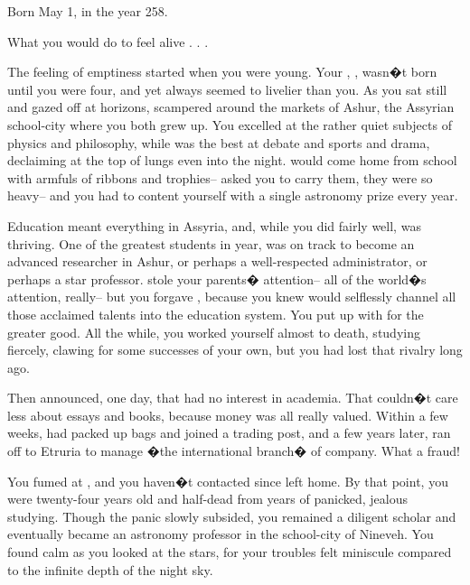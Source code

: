 \documentclass[char]{Kos}
\begin{document}
\name{\cAnarchist{}}

Born May 1, in the year 258.

What you would do to feel alive . . .

The feeling of emptiness started when you were young. Your \cMerchant{\sibling}, \cMerchant{\nickname}, wasn�t born until you were four, and yet \cMerchant{\they} always seemed to livelier than you. As you sat still and gazed off at horizons, \cMerchant{\they} scampered around the markets of Ashur, the Assyrian school-city where you both grew up. You excelled at the rather quiet subjects of physics and philosophy, while \cMerchant{\they} was the best at debate and sports and drama, declaiming at the top of \cMerchant{\their} lungs even into the night. \cMerchant{\They} would come home from school with armfuls of ribbons and trophies-- \cMerchant{\they} asked you to carry them, they were so heavy-- and you had to content yourself with a single astronomy prize every year.

Education meant everything in Assyria, and, while you did fairly well, \cMerchant{} was thriving. One of the greatest students in \cMerchant{\their} year, \cMerchant{\they} was on track to become an advanced researcher in Ashur, or perhaps a well-respected administrator, or perhaps a star professor. \cMerchant{\They} stole your parents� attention-- all of the world�s attention, really-- but you forgave \cMerchant{\them}, because you knew \cMerchant{\they} would selflessly channel all those acclaimed talents into the education system. You put up with \cMerchant{\them} for the greater good. All the while, you worked yourself almost to death, studying fiercely, clawing for some successes of your own, but you had lost that rivalry long ago.

Then \cMerchant{\they} announced, one day, that \cMerchant{\they} had no interest in academia. That \cMerchant{\they} couldn�t care less about essays and books, because money was all \cMerchant{\they} really valued. Within a few weeks, \cMerchant{\they} had packed up \cMerchant{\their} bags and joined a trading post, and a few years later, \cMerchant{\they} ran off to Etruria to manage �the international branch� of \cMerchant{\their} company. What a fraud!

You fumed at \cMerchant{\them}, and you haven�t contacted \cMerchant{\them} since \cMerchant{\they} left home. By that point, you were twenty-four years old and half-dead from years of panicked, jealous studying. Though the panic slowly subsided, you remained a diligent scholar and eventually became an astronomy professor in the school-city of Nineveh. You found calm as you looked at the stars, for your troubles felt miniscule compared to the infinite depth of the night sky.
\end{document}
